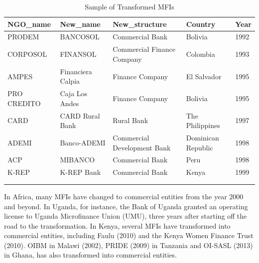 \documentclass[a4paper, nobind]{templates/ociamthesis}
\begin{document}
\begin{table}

\caption{\label{tab:unnamed-chunk-3}Sample of Transformed MFIs}
\centering
\fontsize{8}{10}\selectfont
\begin{tabu} to 
\toprule
NGO\_name & New\_name & New\_structure & Country & Year\\
\midrule
PRODEM & BANCOSOL & Commercial Bank & Bolivia & 1992\\
CORPOSOL & FINANSOL & Commercial Finance Company & Colombia & 1993\\
AMPES & Financiera Calpia & Finance Company & El Salvador & 1995\\
PRO CREDITO & Caja Los Andes & Finance Company & Bolivia & 1995\\
CARD & CARD Rural Bank & Rural Bank & The Philippines & 1997\\
\addlinespace
ADEMI & Banco-ADEMI & Commercial Development Bank & Dominican Republic & 1998\\
ACP & MIBANCO & Commercial Bank & Peru & 1998\\
K-REP & K-REP Bank & Commercial Bank & Kenya & 1999\\
\bottomrule
{}\\
\\
\end{tabu}
\end{table}

In Africa, many MFIs have changed to commercial entities from the year 2000 and beyond. In Uganda, for instance, the Bank of Uganda granted an operating license to Uganda Microfinance Union (UMU), three years after starting off the road to the transformation. In Kenya, several MFIs have transformed into commercial entities, including Faulu (2010) and the Kenya Women Finance Trust (2010). OIBM in Malawi (2002), PRIDE (2009) in Tanzania and OI-SASL (2013) in Ghana, has also transformed into commercial entities.
\end{document}
